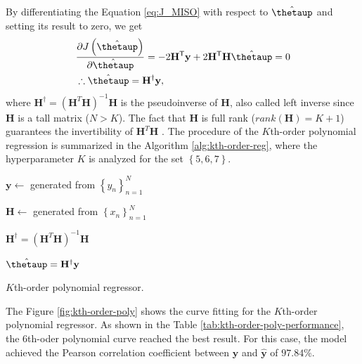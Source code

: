 \documentclass[english]{sobraep}
\newcommand{\trans}{\mathsf{T}}
\begin{document}
By differentiating the Equation \eqref{eq:J_MISO} with respect to \(\hat{\boldsymbol{\thetaup}}\) and setting its result to zero, we get
\begin{align}
    &\frac{\partial J\left( \hat{\boldsymbol{\thetaup}} \right)}{\partial \hat{\boldsymbol{\thetaup}}} = - 2\mathbf{H}^\trans \mathbf{y} + 2 \mathbf{H}^\trans \mathbf{H} \hat{\boldsymbol{\thetaup}} = 0 \nonumber \\
    &\therefore \hat{\boldsymbol{\thetaup}} = \mathbf{H}^\dagger \mathbf{y},
\end{align}
where \(\mathbf{H}^\dagger = \left( \mathbf{H}^T\mathbf{H} \right)^{-1}\mathbf{H}\) is the pseudoinverse of \(\mathbf{H}\), also called left inverse since \(\mathbf{H}\) is a tall matrix (\(N>K\)). The fact that \(\mathbf{H}\) is full rank (\(rank(\mathbf{H})=K+1\)) guarantees the invertibility of \(\mathbf{H}^T\mathbf{H}\) \cite{strang1993introduction}. The procedure of the \(K\)th-order polynomial regression is summarized in the Algorithm \ref{alg:kth-order-reg}, where the hyperparameter \(K\) is analyzed for the set \(\left\{ 5,6,7 \right\}\).

\begin{algorithm}[!ht]
    \DontPrintSemicolon
      
        {
            \(\mathbf{y} \leftarrow\) generated from \(\left\{ y_n \right\}_{n=1}^N\)

            \(\mathbf{H} \leftarrow\) generated from \(\left\{ x_n \right\}_{n=1}^N\)

            \(\mathbf{H}^\dagger = \left( \mathbf{H}^T\mathbf{H} \right)^{-1}\mathbf{H}\) 

            \(\hat{\boldsymbol{\thetaup}} = \mathbf{H}^\dagger \mathbf{y}\)
        }
    
    \caption{\(K\)th-order polynomial regressor.}
    \label{alg:kth-order-reg}
\end{algorithm}

The Figure \ref{fig:kth-order-poly} shows the curve fitting for the \(K\)th-order polynomial regressor. As shown in the Table \ref{tab:kth-order-poly-performance}, the 6th-oder polynomial curve reached the best result. For this case, the model achieved the Pearson correlation coefficient between \(\mathbf{y}\) and \(\hat{\mathbf{y}}\) of \(97.84\%\).
\end{document}
